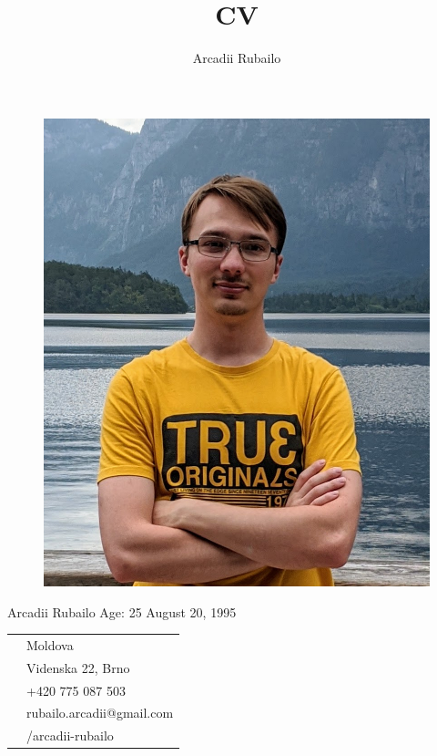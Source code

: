 \documentclass[12pt, a4paper]{article}
\title{CV}
\author{Arcadii Rubailo}
\begin{document}
\begin{minipage}[t]{0.35\textwidth}
    \begin{figure}[H]
        \vspace*{-12pt}
        \includegraphics[width=\textwidth]{profile}
    \end{figure}
    Arcadii Rubailo \newline
    Age: 25 August 20, 1995 \newline
    \begin{tabular}{ l l }
             &    Moldova \\
             &    Videnska 22, Brno \\
            &   +420 775 087 503 \\
            &   rubailo.arcadii@gmail.com \\
         &   /arcadii-rubailo \\

\end{tabular}
\end{minipage}
\end{document}
